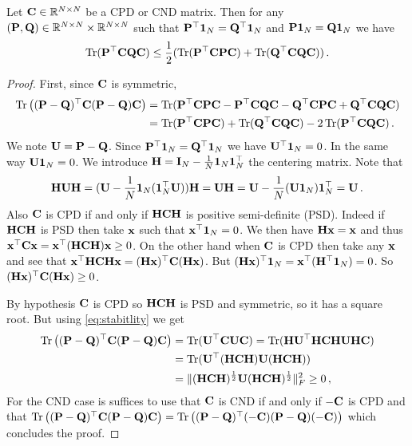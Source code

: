 \begin{lemma}
	\label{ineq:lemma}
	Let $\mC \in \R^{N \times N}$ be a CPD or CND matrix. Then for any  $(\mP, \mQ) \in \R^{N \times N} \times \R^{N \times N}$ such that $\mP^\top \one_N = \mQ^\top \one_N$ and $\mP \one_N = \mQ \one_N$ we have
	\begin{equation}
		\tr(\mP^\top \mC \mQ \mC) \leq \frac{1}{2}(\tr(\mP^\top \mC \mP \mC)+\tr(\mQ^\top \mC \mQ \mC))\,.
	\end{equation}
\end{lemma}
\begin{proof}
	First, since $\mC$ is symmetric,
	\begin{equation}
		\begin{split}
			\tr\left((\mP-\mQ)^\top \mC (\mP-\mQ)\mC\right) &= \tr(\mP^\top \mC \mP \mC- \mP^\top \mC \mQ \mC- \mQ^\top \mC \mP \mC +\mQ^\top \mC \mQ \mC ) \\
			&=\tr(\mP^\top \mC \mP \mC) + \tr(\mQ^\top \mC \mQ \mC) -2 \tr(\mP^\top \mC \mQ \mC)\,.
		\end{split}
	\end{equation}
	We note $\mU = \mP- \mQ$. Since $\mP^\top \one_N = \mQ^\top \one_N$ we have $\mU^\top \one_N = 0$. In the same way $\mU \one_N = 0$. We introduce $\mH = \mI_N - \frac{1}{N} \one_N \one_N^\top$ the  centering matrix. Note that 
	\begin{equation}
		\label{eq:stabitlity}
		\mH \mU \mH = (\mU - \frac{1}{N} \one_N (\one_N^\top\mU))\mH = \mU \mH = \mU -\frac{1}{N} (\mU \one_N) \one_N^\top = \mU\,.
	\end{equation}
	Also $\mC$ is CPD if and only if $\mH \mC \mH$ is positive semi-definite (PSD). Indeed if $\mH \mC \mH$ is PSD then take $\vx$ such that $\vx^\top \one_N = 0$. We then have $\mH \vx = \vx$ and thus $\vx^\top \mC \vx = \vx^\top (\mH \mC \mH) \vx \geq 0$. On the other hand when $\mC$ is CPD then take any $\vx$ and see that $\vx^\top \mH \mC \mH \vx = (\mH \vx)^\top \mC (\mH \vx)$. But $(\mH \vx)^\top \one_N= \vx^\top (\mH^\top \one_N) = 0$. So $(\mH \vx)^\top \mC (\mH \vx) \geq 0$.
	
	By hypothesis $\mC$ is CPD so $\mH \mC \mH$ is PSD and symmetric, so it has a square root. But using \cref{eq:stabitlity} we get
	\begin{equation}
		\begin{split}
			\tr\left((\mP-\mQ)^\top \mC (\mP-\mQ)\mC\right) & = \tr(\mU^\top \mC \mU \mC) = \tr(\mH\mU^\top \mH \mC \mH \mU \mH \mC) \\
			&=\tr(\mU^\top (\mH \mC \mH) \mU (\mH \mC \mH))\\
			&=\|(\mH \mC \mH)^{\frac{1}{2}} \mU (\mH \mC \mH)^{\frac{1}{2}}\|_F^2 \geq 0\,,
		\end{split}
	\end{equation}
	For the CND case is suffices to use that $\mC$ is CND if and only if $-\mC$ is CPD and that $\tr\left((\mP-\mQ)^\top \mC (\mP-\mQ)\mC\right)= \tr\left((\mP-\mQ)^\top (-\mC) (\mP-\mQ)(-\mC)\right)$ which concludes the proof. 
\end{proof}
